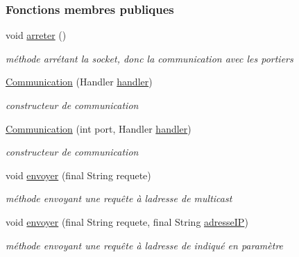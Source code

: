 \subsubsection*{Fonctions membres publiques}
\begin{DoxyCompactItemize}
\item 
void \hyperlink{classcom_1_1lasalle_1_1meeting_1_1_communication_abf23e6b879122267b3fe10233b4010a8}{arreter} ()
\begin{DoxyCompactList}\small\item\em méthode arrétant la socket, donc la communication avec les portiers \end{DoxyCompactList}\item 
\hyperlink{classcom_1_1lasalle_1_1meeting_1_1_communication_a3d73554b2774d3274ad385b0faa27d14}{Communication} (Handler \hyperlink{classcom_1_1lasalle_1_1meeting_1_1_communication_a05fa5f360f28819a9e106e0265a74643}{handler})
\begin{DoxyCompactList}\small\item\em constructeur de communication \end{DoxyCompactList}\item 
\hyperlink{classcom_1_1lasalle_1_1meeting_1_1_communication_a38c93366f750b357d248572d85577d8f}{Communication} (int port, Handler \hyperlink{classcom_1_1lasalle_1_1meeting_1_1_communication_a05fa5f360f28819a9e106e0265a74643}{handler})
\begin{DoxyCompactList}\small\item\em constructeur de communication \end{DoxyCompactList}\item 
void \hyperlink{classcom_1_1lasalle_1_1meeting_1_1_communication_a1566200ca56ba63eec13d0ce37e6c7ee}{envoyer} (final String requete)
\begin{DoxyCompactList}\small\item\em méthode envoyant une requête à l\textquotesingle{}adresse de multicast \end{DoxyCompactList}\item 
void \hyperlink{classcom_1_1lasalle_1_1meeting_1_1_communication_a5dc5cc6c702a8d5da58c06afde637853}{envoyer} (final String requete, final String \hyperlink{classcom_1_1lasalle_1_1meeting_1_1_communication_a46e5fbc8ec97ad651d544e09121a6468}{adresse\+IP})
\begin{DoxyCompactList}\small\item\em méthode envoyant une requête à l\textquotesingle{}adresse de indiqué en paramètre \end{DoxyCompactList}\item 

\end{DoxyCompactItemize}
